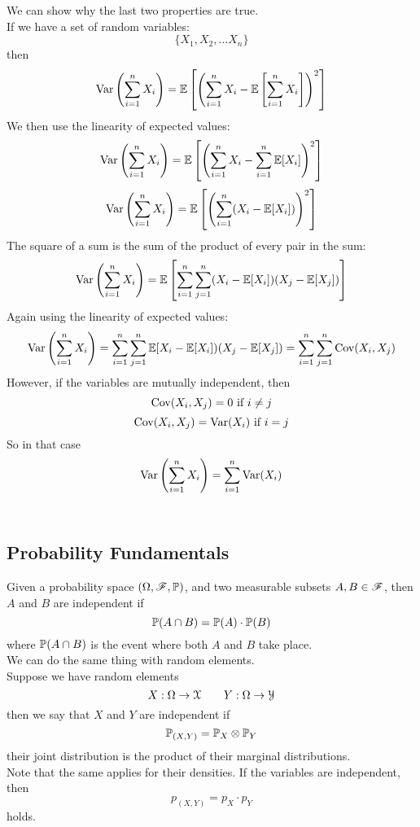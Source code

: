 \documentclass[12pt]{article}
\begin{document}
    We can show why the last two
    properties are true. \\
    If we have a set of random 
    variables:
    \[ \{ X_1, X_2, \dots X_n \} \]
    then
    \[ \text{Var}\left( \sum_{i=1}^{n}X_i \right)
        = \mathbb{E}\left[ \left( \sum_{i=1}^{n}X_i 
    - \mathbb{E}\left[ \sum_{i=1}^{n}X_i \right] \right)^2 \right]\]
    We then use the linearity of expected values:
    \[ \text{Var}\left( \sum_{i=1}^{n}X_i \right)
    = \mathbb{E}\left[ \left( \sum_{i=1}^{n}X_i 
    - \sum_{i=1}^{n}\mathbb{E}[X_i] \right)^2 \right]\]
    \[ \text{Var}\left( \sum_{i=1}^{n}X_i \right)
    = \mathbb{E}\left[ \left( \sum_{i=1}^{n} (X_i 
    - \mathbb{E}[X_i]) \right)^2 \right]\]
    The square of a sum
    is the sum of the product 
    of every pair in the sum:
    \[ \text{Var}\left( \sum_{i=1}^{n}X_i \right)
    = \mathbb{E}\left[ \sum_{i=1}^{n}\sum_{j=1}^{n}
    (X_i - \mathbb{E}[X_i])(X_j - \mathbb{E}[X_j]) \right]\]
    Again using the linearity of expected values:
    \[ \text{Var}\left( \sum_{i=1}^{n}X_i \right)
    = \sum_{i=1}^{n}\sum_{j=1}^{n}
    \mathbb{E}[X_i - \mathbb{E}[X_i])(X_j - \mathbb{E}[X_j])
    = \sum_{i=1}^{n}\sum_{j=1}^{n}\text{Cov}(X_i, X_j) \]
    However, if the variables are mutually
    independent, then
    \[ \text{Cov}(X_i, X_j) = 0 \text{ if } i \neq j\]
    \[ \text{Cov}(X_i, X_j) = \text{Var}(X_i) 
    \text{ if } i = j\]
    So in that case
    \[ \text{Var}\left( \sum_{i=1}^{n}X_i \right) = 
    \sum_{i=1}^{n} \text{Var}(X_i) \] \\

    \newpage

    \subsection*{Probability Fundamentals}

    Given a probability space
    $(\Omega, \mathscr{F}, \mathbb{P})$,
    and two measurable subsets
    $A, B \in \mathscr{F}$,
    then $A$ and $B$
    are independent if
    \[ \mathbb{P}(A \cap B) 
    = \mathbb{P}(A) \cdot \mathbb{P}(B) \]
    where $ \mathbb{P}(A \cap B)$
    is the event where both $A$
    and $B$ take place. \\

    We can do the same thing
    with random elements. \\
    Suppose we have random elements
    \[ X: \Omega \to \mathcal{X} \qquad
    Y: \Omega \to \mathcal{Y} \]
    then we say that $X$ and $Y$
    are independent if
    \[ \mathbb{P}_{(X, Y)}
    = \mathbb{P}_X \otimes \mathbb{P}_Y \]
    their joint distribution is the
    product of their marginal distributions. \\
    Note that the same applies
    for their densities.
    If the variables are independent,
    then 
    \[ p_{(X, Y)} = p_X \cdot p_Y \]
    holds. \\
\end{document}
